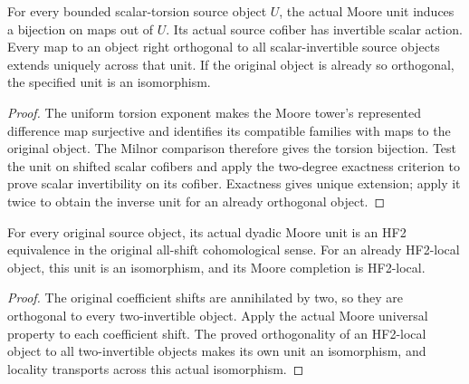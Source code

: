 \begin{proposition}
  \label{prop:actual-source-moore-universal}
  \leanok
  For every bounded scalar-torsion source object $U$, the actual Moore unit induces a bijection on maps out of $U$. Its actual source cofiber has invertible scalar action. Every map to an object right orthogonal to all scalar-invertible source objects extends uniquely across that unit. If the original object is already so orthogonal, the specified unit is an isomorphism.
\end{proposition}
\begin{proof}
  The uniform torsion exponent makes the Moore tower's represented difference map surjective and identifies its compatible families with maps to the original object. The Milnor comparison therefore gives the torsion bijection. Test the unit on shifted scalar cofibers and apply the two-degree exactness criterion to prove scalar invertibility on its cofiber. Exactness gives unique extension; apply it twice to obtain the inverse unit for an already orthogonal object.
  \leanok
\end{proof}

\begin{proposition}
  \label{prop:actual-source-moore-coefficient-equivalence}
  \leanok
  For every original source object, its actual dyadic Moore unit is an HF2 equivalence in the original all-shift cohomological sense. For an already HF2-local object, this unit is an isomorphism, and its Moore completion is HF2-local.
\end{proposition}
\begin{proof}
  The original coefficient shifts are annihilated by two, so they are orthogonal to every two-invertible object. Apply the actual Moore universal property to each coefficient shift. The proved orthogonality of an HF2-local object to all two-invertible objects makes its own unit an isomorphism, and locality transports across this actual isomorphism.
  \leanok
\end{proof}

